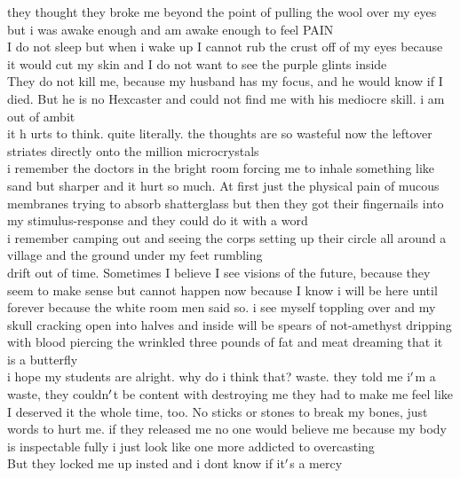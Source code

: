 \documentclass[12pt]{article}
\begin{document}
  
    they thought they broke me beyond the point of pulling the wool over my eyes but i was awake enough and am awake enough to feel PAIN\\I do not sleep but when i wake up I cannot rub the crust off of my eyes because it would cut my skin and I do not want to see the purple glints inside\\


  
    They do not kill me, because my husband has my focus, and he would know if I died. But he is no Hexcaster and could not find me with his mediocre skill. i am out of ambit\\it  h urts to think. quite literally. the thoughts are so wasteful now the leftover striates directly onto the million microcrystals\\


  
    i remember the doctors in the bright room forcing me to inhale something like sand but sharper and it hurt so much. At first just the physical pain of mucous membranes trying to absorb shatterglass but then they got their fingernails into my stimulus-response and they could do it with a word\\i remember camping out and seeing the corps setting up their circle all around a village and the ground under my feet rumbling\\


  
    drift out of time. Sometimes I believe I see visions of the future, because they seem to make sense but cannot happen now because I know i will be here until forever because the white room men said so. i see myself toppling over and my skull cracking open into halves and inside will be spears of not-amethyst dripping with blood piercing the wrinkled three pounds of fat and meat dreaming that it is a butterfly\\


  
    i hope my students are alright. why do i think that? waste. they told me i$\rq$m a waste, they couldn$\rq$t be content with destroying me they had to make me feel like I deserved it the whole time, too. No sticks or stones to break my bones, just words to hurt me. if they released me no one would believe me because my body is inspectable fully i just look like one more addicted to overcasting\\But they locked me up insted and i dont know if it$\rq$s a mercy\\
\end{document}
